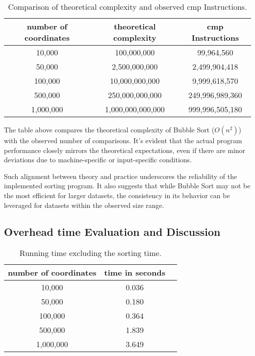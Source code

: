 \documentclass[12pt,a4paper]{article}
\begin{document}
\begin{table}[ht]
    \centering
    \small
    \begin{tabular}{ccc}
        \toprule
        number of coordinates & theoretical complexity & cmp Instructions \\
        \midrule
        10,000      & 100,000,000            & 99,964,560 \\
        50,000      & 2,500,000,000          & 2,499,904,418 \\
        100,000     & 10,000,000,000         & 9,999,618,570 \\
        500,000     & 250,000,000,000        & 249,996,989,360 \\
        1,000,000   & 1,000,000,000,000      & 999,996,505,180 \\
        \bottomrule
    \end{tabular}
    \caption{Comparison of theoretical complexity and observed cmp Instructions.}
\end{table}

The table above compares the theoretical complexity of Bubble Sort (\(O(n^2)\)) with the observed number of comparisons. It's evident that the actual program performance closely mirrors the theoretical expectations, even if there are minor deviations due to machine-specific or input-specific conditions. 

Such alignment between theory and practice underscores the reliability of the implemented sorting program. It also suggests that while Bubble Sort may not be the most efficient for larger datasets, the consistency in its behavior can be leveraged for datasets within the observed size range.


\subsection{Overhead time Evaluation and Discussion}

\begin{table}[ht]
    \centering
    \small
    \begin{tabular}{ccc}
        \toprule
        number of coordinates & time in seconds \\
        \midrule
        10,000      & 0.036 \\
        50,000      & 0.180 \\
        100,000     & 0.364 \\
        500,000     & 1.839 \\
        1,000,000   & 3.649 \\
        \bottomrule
    \end{tabular}
    \caption{Running time excluding the sorting time.}
\end{table}
\end{document}
